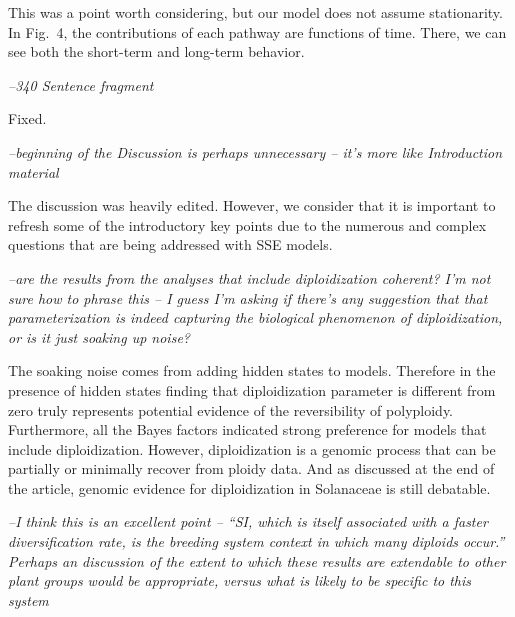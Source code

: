 \documentclass[11pt]{article}
\renewenvironment{quote}{\bigskip\noindent\itshape\ignorespaces}{\smallskip}
\begin{document}
This was a point worth considering, but our model does not assume stationarity. 
In Fig.~4, the contributions of each pathway are functions of time.
There, we can see both the short-term and long-term behavior.


\begin{quote}
--340  Sentence fragment
\end{quote}

Fixed. 


\begin{quote}
--beginning of the Discussion is perhaps unnecessary -- it's more like Introduction material
\end{quote}

The discussion was heavily edited. However, we consider that it is important to refresh some of the introductory key points due to the numerous and complex questions that are being addressed with SSE models. 

\begin{quote}
--are the results from the analyses that include diploidization coherent?
I'm not sure how to phrase this -- I guess I'm asking if there's any suggestion that that parameterization is indeed capturing the biological phenomenon of diploidization, or is it just soaking up noise?
\end{quote}

The soaking noise comes from adding  hidden states to models. Therefore in the presence of hidden states finding that diploidization  parameter is different from zero truly represents potential evidence of the reversibility of polyploidy. 
Furthermore, all the Bayes factors indicated strong preference for models that include diploidization. 
However, diploidization is a genomic process that can be partially or minimally recover from ploidy data. 
And as discussed at the end of the article, genomic evidence for diploidization in Solanaceae  is still debatable. 

\begin{quote}
--I think this is an excellent point -- ``SI, which is itself associated with a faster diversification rate, is the breeding system context in which many diploids occur.''
Perhaps an discussion of the extent to which these results are extendable to other plant groups would be appropriate, versus what is likely to be specific to this system
\end{quote}
\end{document}
